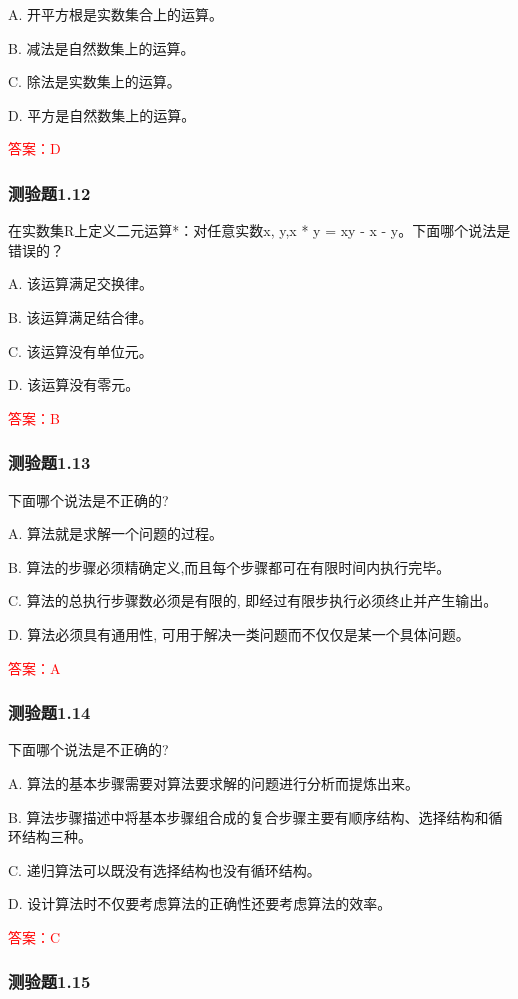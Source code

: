 \documentclass[UTF8, heading=true]{ctexart}
\begin{document}
A. 开平方根是实数集合上的运算。

B. 减法是自然数集上的运算。

C. 除法是实数集上的运算。

D. 平方是自然数集上的运算。

\textcolor{red}{答案：D}

\subsubsection{测验题1.12}

在实数集R上定义二元运算*：对任意实数x, y,x * y = xy - x - y。下面哪个说法是错误的？

A. 该运算满足交换律。

B. 该运算满足结合律。

C. 该运算没有单位元。

D. 该运算没有零元。

\textcolor{red}{答案：B}

\subsubsection{测验题1.13}

下面哪个说法是不正确的?

A. 算法就是求解一个问题的过程。

B. 算法的步骤必须精确定义,而且每个步骤都可在有限时间内执行完毕。

C. 算法的总执行步骤数必须是有限的, 即经过有限步执行必须终止并产生输出。

D. 算法必须具有通用性, 可用于解决一类问题而不仅仅是某一个具体问题。

\textcolor{red}{答案：A}

\subsubsection{测验题1.14}

下面哪个说法是不正确的?

A. 算法的基本步骤需要对算法要求解的问题进行分析而提炼出来。

B. 算法步骤描述中将基本步骤组合成的复合步骤主要有顺序结构、选择结构和循环结构三种。

C. 递归算法可以既没有选择结构也没有循环结构。

D. 设计算法时不仅要考虑算法的正确性还要考虑算法的效率。

\textcolor{red}{答案：C}

\subsubsection{测验题1.15}
\end{document}
